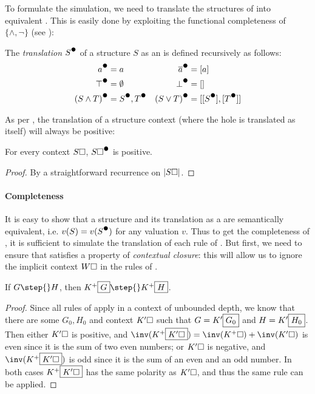 \begin{scope}
To formulate the simulation, we need to translate the structures of 
into equivalent . This is easily done by exploiting the
functional completeness of $\{\land, \neg\}$ (see ):

\begin{definition}
  The \emph{translation} $\strans{S}$ of a structure $S$ as an  is
  defined recursively as follows:
  \begin{align*}
    \strans{a} &= a & \strans{\dmdual{a}} &= [a] \\
    \strans{\top} &= \emptyset & \strans{\bot} &= [] \\
    \strans{(S \land T)} &= \strans{S}, \strans{T} & \strans{(S \lor T)} &= [[\strans{S}], [\strans{T}]]
  \end{align*}
\end{definition}

As per , the translation of a structure context (where
the hole is translated as itself) will always be positive:

\begin{fact}
  For every context $S\square$, $\strans{S\hole}$ is positive.
\end{fact}
\begin{proof}
  By a straightforward recurrence on $\left|S\square\right|$.
\end{proof}

\paragraph{Completeness}

It is easy to show that a structure and its translation as a  are
semantically equivalent, i.e. $v(S) = v(\strans{S})$ for any valuation $v$. Thus
to get the completeness of , it is sufficient to simulate the
translation of each rule of . But first, we need to ensure that
 satisfies a property of \emph{contextual closure}: this will allow
us to ignore the implicit context $W\square$ in the rules of .

\begin{lemma}
  If $G \step{} H$, then $K^+\select{G} \step{} K^+\select{H}$.
\end{lemma}
\begin{proof}
  Since all rules of  apply in a context of unbounded depth, we know
  that there are some  $G_0, H_0$ and context $K'\square$ such that $G =
  K'\fbox{$G_0$}$ and $H = K'\fbox{$H_0$}$. Then either $K'\square$ is positive,
  and $\inv(K^+\select{K'\hole}) = \inv(K^+\hole) + \inv(K'\hole)$ is even since
  it is the sum of two even numbers; or $K'\square$ is negative, and
  $\inv(K^+\select{K'\hole})$ is odd since it is the sum of an even and an odd
  number. In both cases $K^+\fbox{$K'\square$}$ has the same polarity as
  $K'\square$, and thus the same rule can be applied.
\end{proof}


\end{scope}
